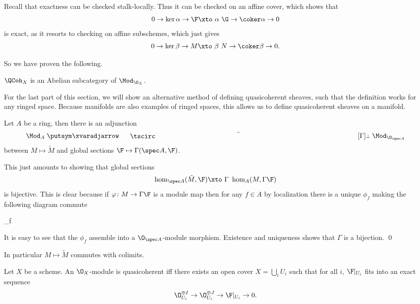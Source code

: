 Recall that exactness can be checked stalk-locally.
Thus it can be checked on an affine cover, which shows that
$$ 0 \to \ker\alpha \to \F \xtos\alpha \G \to \coker\alpha \to 0 $$
is exact, as it resorts to checking on affine subschemes, which just gives
$$ 0 \to \ker\beta \to M \xtos\beta N \to \coker\beta \to 0 . $$

So we have proven the following.

\bthrm

    $\QCoh_X$ is an Abelian subcategory of $\Mod_{\O_X}$.

\ethrm

For the last part of this section, we will show an alternative method of defining quasicoherent sheaves, such that the definition works for any ringed space.
Because manifolds are also examples of ringed spaces, this allows us to define quasicoherent sheaves on a manifold.

\bprop

    Let $A$ be a ring, then there is an adjunction
    $$ \Mod_A \adjarrow{\tilde\bul}{\Gamma} \Mod_{\O_{\spec A}} $$
    between $M\mapsto\tilde M$ and global sections $\F\mapsto\Gamma(\spec A,\F)$.

\eprop

\bproof

    This just amounts to showing that global sections
    $$ \hom_{\spec A}(\tilde M,\F) \xtos\Gamma \hom_A(M,\Gamma\F) $$
    is bijective.
    This is clear because if $\phi\colon M\to\Gamma\F$ is a module map then for any $f\in A$ by localization there is a unique $\phi_f$ making the following diagram commute

        {\phi}{\phi_f}{}{}

    It is easy to see that the $\phi_f$ assemble into a $\O_{\spec A}$-module morphism.
    Existence and uniqueness shows that $\Gamma$ is a bijection.
    \qed

\eproof

In particular $M\mapsto\tilde M$ commutes with colimits.

\bprop[name={qcoherentgeneral}]

    Let $X$ be a scheme.
    An $\O_X$-module is quasicoherent iff there exists an open cover $X=\bigcup_iU_i$ such that for all $i$, $\F|_{U_i}$ fits into an exact sequence
    $$ \O_{U_i}^{\oplus I} \to \O_{U_i}^{\oplus J} \to \F|_{U_i} \to 0 . $$

\eprop

\bproof

